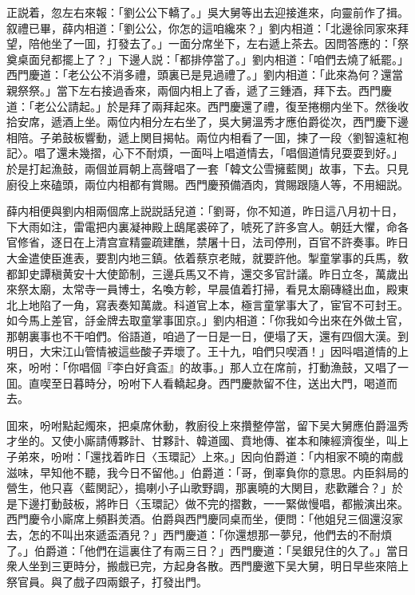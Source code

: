 正説着，忽左右來報：「劉公公下轎了。」吳大舅等出去迎接進來，向靈前作了揖。叙禮已畢，薛内相道：「劉公公，你怎的這咱纔來？」劉内相道：「北邊徐同家來拜望，陪他坐了一囬，打發去了。」一面分席坐下，左右遞上茶去。因問答應的：「祭奠桌面兒都擺上了？」下邊人説：「都排停當了。」劉内相道：「咱們去燒了紙罷。」西門慶道：「老公公不消多禮，頭裏已是見過禮了。」劉内相道：「此來為何？還當親祭祭。」當下左右接過香來，兩個内相上了香，遞了三鍾酒，拜下去。西門慶道：「老公公請起。」於是拜了兩拜起來。西門慶還了禮，復至捲棚内坐下。然後收拾安席，遞酒上坐。兩位内相分左右坐了，吳大舅溫秀才應伯爵從次，西門慶下邊相陪。子弟鼓板響動，遞上関目揭帖。兩位内相看了一囬，揀了一段〈劉智遠紅袍記〉。唱了還未幾摺，心下不耐煩，一面呌上唱道情去，「唱個道情兒耍耍到好。」於是打起漁鼓，兩個並肩朝上高聲唱了一套「韓文公雪擁藍関」故事，下去。只見廚役上來磕頭，兩位内相都有賞賜。西門慶預備酒肉，賞賜跟隨人等，不用細説。

薛内相便與劉内相兩個席上説説話兒道：「劉哥，你不知道，昨日這八月初十日，下大雨如注，雷電把内裏凝神殿上鴟尾裘碎了，唬死了許多宫人。朝廷大懼，命各官修省，逐日在上清宫宣精靈疏建醮，禁屠十日，法司停刑，百官不許奏事。昨日大金遣使臣進表，要割内地三鎮。依着蔡京老賊，就要許他。掣童掌事的兵馬，敎都卸史譚稹黄安十大使節制，三邊兵馬又不肯，還交多官計議。昨日立冬，萬歲出來祭太廟，太常寺一員博士，名喚方軫，早晨值着打掃，看見太廟磚縫出血，殿東北上地陷了一角，寫表奏知萬歲。科道官上本，極言童掌事大了，宦官不可封王。如今馬上差官，㧱金牌去取童掌事囬京。」劉内相道：「你我如今出來在外做土官，那朝裏事也不干咱們。俗語道，咱過了一日是一日，便塌了天，還有四個大漢。到明日，大宋江山管情被這些酸子弄壞了。王十九，咱們只喫酒！」因呌唱道情的上來，吩咐：「你唱個『李白好貪盃』的故事。」那人立在席前，打動漁鼓，又唱了一囬。直喫至日暮時分，吩咐下人看轎起身。西門慶款留不住，送出大門，喝道而去。

囬來，吩咐點起燭來，把桌席休動，教廚役上來攢整停當，留下吴大舅應伯爵溫秀才坐的。又使小廝請傅夥計、甘夥計、韓道國、賁地傳、崔本和陳經濟復坐，叫上子弟來，吩咐：「還找着昨日〈玉環記〉上來。」因向伯爵道：「内相家不曉的南戲滋味，早知他不聽，我今日不留他。」伯爵道：「哥，倒辜負你的意思。内臣斜局的營生，他只喜〈藍関記〉，搗喇小子山歌野調，那裏曉的大関目，悲歡離合？」於是下邊打動鼓板，將昨日〈玉環記〉做不完的摺數，一一緊做慢唱，都搬演出來。西門慶令小廝席上頻斟羙酒。伯爵與西門慶同桌而坐，便問：「他姐兒三個還沒家去，怎的不叫出來遞盃酒兒？」西門慶道：「你還想那一夢兒，他們去的不耐煩了。」伯爵道：「他們在這裏住了有兩三日？」西門慶道：「吴銀兒住的久了。」當日衆人坐到三更時分，搬戲已完，方起身各散。西門慶邀下吴大舅，明日早些來陪上祭官員。與了戲子四兩銀子，打發出門。

